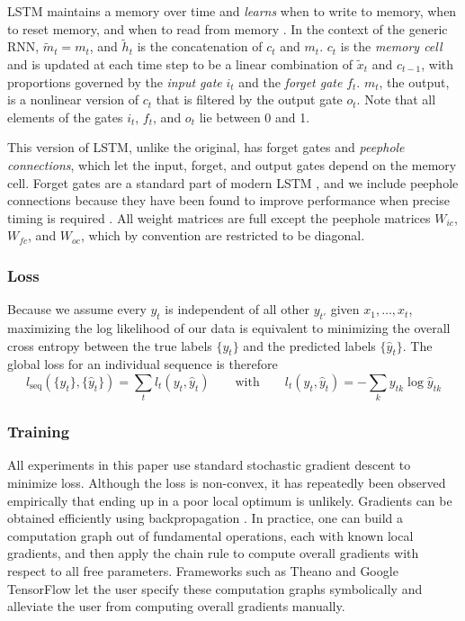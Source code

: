 \documentclass{llncs}
\begin{document}
LSTM maintains a memory over time and \emph{learns} when to write to memory, when to reset memory, and when to read from memory \cite{graves2012supervised}. In the context of the generic RNN, $\tilde{m}_t = m_t$, and $\tilde{h}_t$ is the concatenation of $c_t$ and $m_t$. $c_t$ is the \emph{memory cell} and is updated at each time step to be a linear combination of $\tilde{x}_t$ and $c_{t-1}$, with proportions governed by the \emph{input gate} $i_t$ and the \emph{forget gate} $f_t$. $m_t$, the output, is a nonlinear version of $c_t$ that is filtered by the output gate $o_t$. Note that all elements of the gates $i_t$, $f_t$, and $o_t$ lie between 0 and 1.

This version of LSTM, unlike the original, has forget gates and \emph{peephole connections}, which let the input, forget, and output gates depend on the memory cell. Forget gates are a standard part of modern LSTM \cite{greff2015lstm}, and we include peephole connections because they have been found to improve performance when precise timing is required \cite{gers2000recurrent}. All weight matrices are full except the peephole matrices $W_{ic}$, $W_{fc}$, and $W_{oc}$, which by convention are restricted to be diagonal.

\subsubsection{Loss}

Because we assume every $y_t$ is independent of all other $y_{t'}$ given $x_1, \ldots, x_t$, maximizing the log likelihood of our data is equivalent to minimizing the overall cross entropy between the true labels $\{y_t\}$ and the predicted labels $\{\hat{y}_t\}$. The global loss for an individual sequence is therefore
\begin{equation*}
l_{\mbox{seq}}(\{y_t\}, \{\hat{y}_t\}) = \sum_t l_t(y_t, \hat{y}_t) \qquad \mbox{with} \qquad
l_t(y_t, \hat{y}_t) = -\sum_k y_{tk} \log \hat{y}_{tk}
\end{equation*}

\subsubsection{Training}

All experiments in this paper use standard stochastic gradient descent to minimize loss. Although the loss is non-convex, it has repeatedly been observed empirically that ending up in a poor local optimum is unlikely. Gradients can be obtained efficiently using backpropagation \cite{rumelhart1988learning}. In practice, one can build a computation graph out of fundamental operations, each with known local gradients, and then apply the chain rule to compute overall gradients with respect to all free parameters. Frameworks such as Theano and Google TensorFlow let the user specify these computation graphs symbolically and alleviate the user from computing overall gradients manually.
\end{document}
